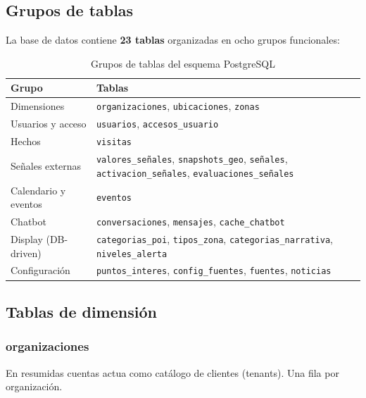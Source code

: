 \documentclass[12pt, a4paper]{article}
\begin{document}
\subsection{Grupos de tablas}

La base de datos contiene \textbf{23 tablas} organizadas en ocho grupos funcionales:

\begin{table}[H]
\centering
\renewcommand{\arraystretch}{1.25}
\begin{tabular}{lp{8cm}}
\toprule
\textbf{Grupo} & \textbf{Tablas} \\
\midrule
Dimensiones        & \texttt{organizaciones}, \texttt{ubicaciones}, \texttt{zonas} \\
Usuarios y acceso  & \texttt{usuarios}, \texttt{accesos\_usuario} \\
Hechos             & \texttt{visitas} \\
Señales externas   & \texttt{valores\_señales}, \texttt{snapshots\_geo}, \texttt{señales}, \texttt{activacion\_señales}, \texttt{evaluaciones\_señales} \\
Calendario y eventos & \texttt{eventos} \\
Chatbot            & \texttt{conversaciones}, \texttt{mensajes}, \texttt{cache\_chatbot} \\
Display (DB-driven) & \texttt{categorias\_poi}, \texttt{tipos\_zona}, \texttt{categorias\_narrativa}, \texttt{niveles\_alerta} \\
Configuración      & \texttt{puntos\_interes}, \texttt{config\_fuentes}, \texttt{fuentes}, \texttt{noticias} \\
\bottomrule
\end{tabular}
\caption{Grupos de tablas del esquema PostgreSQL}
\label{tab:grupos_tablas}
\end{table}

\subsection{Tablas de dimensión}

\subsubsection{organizaciones}

En resumidas cuentas actua como catálogo de clientes (tenants). Una fila por organización.
\end{document}
